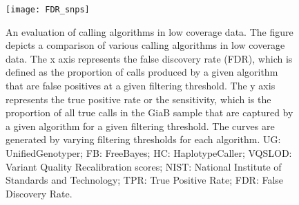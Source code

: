 \begin{figure}[!htbp]
\captionsetup{width=0.8\textwidth}
\caption{An evaluation of calling algorithms in low coverage data. The figure depicts a comparison of various calling algorithms in low coverage data. The x axis represents the false discovery rate (FDR), which is defined as the proportion of calls produced by a given algorithm that are false positives at a given filtering threshold. The y axis represents the true positive rate or the sensitivity, which is the proportion of all true calls in the GiaB sample that are captured by a given algorithm for a given filtering threshold. The curves are generated by varying filtering thresholds for each algorithm. UG: UnifiedGenotyper; FB: FreeBayes; HC: HaplotypeCaller;
VQSLOD: Variant Quality Recalibration scores; NIST: National Institute of Standards and Technology; TPR: True Positive Rate; FDR: False Discovery Rate.}
\label{fig:roc}
\centering
        \texttt{[image: FDR\_snps]}
\end{figure}


%